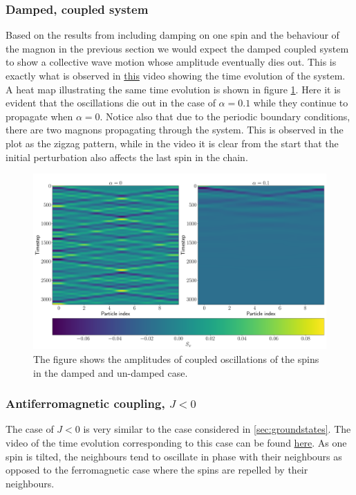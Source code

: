 \subsubsection{Damped, coupled system}

Based on the results from including damping on one spin and the behaviour of the magnon in the previous section we would expect the damped coupled system to show a collective wave motion whose amplitude eventually dies out. This is exactly what is observed in \href{https://folk.ntnu.no/sondrdl/spinwaves/coupled_spins_damped.mp4}{this} video showing the time evolution of the system. A heat map illustrating the same time evolution is shown in figure \ref{fig:damped_heat}. Here it is evident that the oscillations die out in the case of $\alpha = 0.1$ while they continue to propagate when $\alpha = 0$. Notice also that due to the periodic boundary conditions, there are two magnons propagating through the system. This is observed in the plot as the zigzag pattern, while in the video it is clear from the start that the initial perturbation also affects the last spin in the chain.

\begin{figure}[htb]
	\centering
	\includegraphics[width=\columnwidth]{../fig/damped_vs_undamped.pdf}
	\caption{The figure shows the amplitudes of coupled oscillations of the spins in the damped and un-damped case.}
	\label{fig:damped_heat}
\end{figure}

\subsubsection{Antiferromagnetic coupling, $J<0$}

The case of $J<0$ is very similar to the case considered in \ref{sec:groundstates}. The video of the time evolution corresponding to this case can be found \href{https://folk.ntnu.no/sondrdl/spinwaves/coupled_spins_anti.mp4}{here}. As one spin is tilted, the neighbours tend to oscillate in phase with their neighbours as opposed to the ferromagnetic case where the spins are repelled by their neighbours. 

